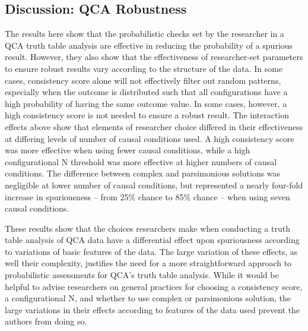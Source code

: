 \documentclass[]{article}
\begin{document}
{%




\subsection{Discussion: QCA Robustness}

The results here show that the probabilistic checks set by the researcher in a QCA truth table analysis are effective in reducing the probability of a spurious result. However, they also show that the effectiveness of researcher-set parameters to ensure robust results vary according to the structure of the data. In some cases, consistency score alone will not effectively filter out random patterns, especially when the outcome is distributed such that all configurations have a high probability of having the same outcome value. In some cases, however, a high consistency score is not needed to ensure a robust result. The interaction effects above show that elements of researcher choice differed in their effectiveness at differing levels of number of causal conditions used. A high consistency score was more effective when using fewer causal conditions, while a high configurational N threshold was more effective at higher numbers of causal conditions. The difference between complex and parsimonious solutions was negligible at lower number of causal conditions, but represented a nearly four-fold increase in spuriousness -- from 25\% chance to 85\% chance -- when using seven causal conditions. 

These results show that the choices researchers make when conducting a truth table analysis of QCA data have a differential effect upon spuriousness according to variations of basic features of the data. The large variation of these effects, as well their complexity, justifies the need for a more straightforward approach to probabilistic assessments for QCA's truth table analysis. While it would be helpful to advise researchers on general practices for choosing a consistency score, a configurational N, and whether to use complex or parsimonious solution, the large variations in their effects according to features of the data used prevent the authors from doing so.

}
\end{document}
